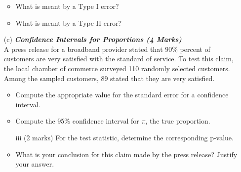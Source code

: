 \begin{itemize}
\begin{itemize}
\item  What is meant by a Type I error?

\item   What is meant by a Type II error?
\end{itemize}
\bigskip


\item[(c)] \textbf{\textit{Confidence Intervals for Proportions (4 Marks)}}\\
A press release for a broadband provider stated that $90\%$ percent of customers are very satisfied
with the standard of service. To test this claim, the local chamber of commerce surveyed 110 randomly selected customers. Among the sampled customers, 89 stated that they are very satisfied.





\begin{itemize}

\item  Compute the appropriate value for the standard error for a confidence interval.

\item  Compute the 95\% confidence interval for $\pi$, the true proportion.
%
\item[iii] (2 marks) For the test statistic, determine the corresponding p-value.

\item  What is your conclusion for this claim made by the press release? Justify your answer.
\end{itemize}
\end{itemize}

